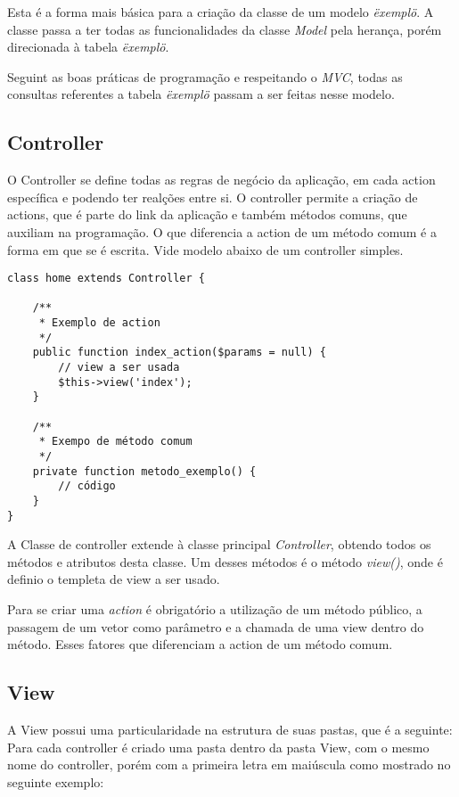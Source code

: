             Esta é a forma mais básica para a criação da classe de um modelo \emph{\"exemplo\"}. A classe passa a ter todas as funcionalidades da classe \emph{Model} pela herança, porém direcionada à tabela \emph{\"exemplo\"}.

            Seguint as boas práticas de programação e respeitando o \emph{MVC}, todas as consultas referentes a tabela \emph{\"exemplo\"} passam a ser feitas nesse modelo.


        \subsection{Controller\label{sec:app-controller}}
            O Controller se define todas as regras de negócio da aplicação, em cada action específica e podendo ter realções entre si. O controller permite a criação de actions, que é parte do link da aplicação e também métodos comuns, que auxiliam na programação. O que diferencia a action de um método comum é a forma em que se é escrita. Vide modelo abaixo de um controller simples.

\begin{lstlisting}
class home extends Controller {

    /**
     * Exemplo de action
     */
    public function index_action($params = null) {
        // view a ser usada
        $this->view('index');
    }

    /**
     * Exempo de método comum
     */
    private function metodo_exemplo() {
        // código
    }
}
\end{lstlisting}

            A Classe de controller extende à classe principal \emph{Controller}, obtendo todos os métodos e atributos desta classe. Um desses métodos é o método \emph{view()}, onde é definio o templeta de view a ser usado.

            Para se criar uma \emph{action} é obrigatório a utilização de um método público, a passagem de um vetor como parâmetro e a chamada de uma view dentro do método. Esses fatores que diferenciam a action de um método comum.


        \subsection{View\label{sec:app-view}}
            A View possui uma particularidade na estrutura de suas pastas, que é a seguinte: Para cada controller é criado uma pasta dentro da pasta View, com o mesmo nome do controller, porém com a primeira letra em maiúscula como mostrado no seguinte exemplo:

